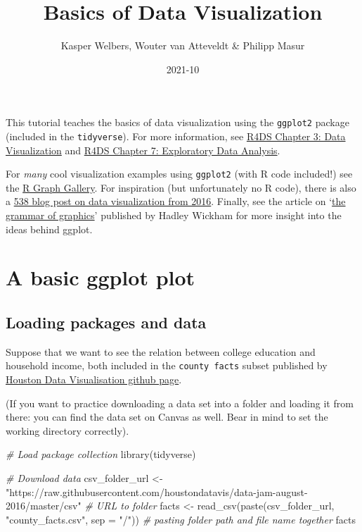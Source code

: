 \documentclass[
]{article}
\title{Basics of Data Visualization}
\author{Kasper Welbers, Wouter van Atteveldt \& Philipp Masur}
\date{2021-10}
\newenvironment{Shaded}{\begin{snugshade}}{\end{snugshade}}
\newcommand{\AttributeTok}[1]{\textcolor[rgb]{0.77,0.63,0.00}{#1}}
\newcommand{\CommentTok}[1]{\textcolor[rgb]{0.56,0.35,0.01}{\textit{#1}}}
\newcommand{\FunctionTok}[1]{\textcolor[rgb]{0.00,0.00,0.00}{#1}}
\newcommand{\NormalTok}[1]{#1}
\newcommand{\OtherTok}[1]{\textcolor[rgb]{0.56,0.35,0.01}{#1}}
\newcommand{\StringTok}[1]{\textcolor[rgb]{0.31,0.60,0.02}{#1}}
\begin{document}
\maketitle

{
\setcounter{tocdepth}{2}
\tableofcontents
}
This tutorial teaches the basics of data visualization using the
\texttt{ggplot2} package (included in the \texttt{tidyverse}). For more
information, see
\href{http://r4ds.had.co.nz/data-visualisation.html}{R4DS Chapter 3:
Data Visualization} and
\href{http://r4ds.had.co.nz/exploratory-data-analysis.html}{R4DS Chapter
7: Exploratory Data Analysis}.

For \emph{many} cool visualization examples using \texttt{ggplot2} (with
R code included!) see the
\href{https://www.r-graph-gallery.com/portfolio/ggplot2-package/}{R
Graph Gallery}. For inspiration (but unfortunately no R code), there is
also a
\href{https://fivethirtyeight.com/features/the-52-best-and-weirdest-charts-we-made-in-2016/}{538
blog post on data visualization from 2016}. Finally, see the article on
`\href{http://vita.had.co.nz/papers/layered-grammar.html}{the grammar of
graphics}' published by Hadley Wickham for more insight into the ideas
behind ggplot.

\hypertarget{a-basic-ggplot-plot}{%
\section{A basic ggplot plot}\label{a-basic-ggplot-plot}}

\hypertarget{loading-packages-and-data}{%
\subsection{Loading packages and data}\label{loading-packages-and-data}}

Suppose that we want to see the relation between college education and
household income, both included in the \texttt{county\ facts} subset
published by
\href{https://github.com/houstondatavis/data-jam-august-2016}{Houston
Data Visualisation github page}.

(If you want to practice downloading a data set into a folder and
loading it from there: you can find the data set on Canvas as well. Bear
in mind to set the working directory correctly).

\begin{Shaded}
\begin{Highlighting}[]
\CommentTok{\# Load package collection}
\FunctionTok{library}\NormalTok{(tidyverse)}

\CommentTok{\# Download data}
\NormalTok{csv\_folder\_url }\OtherTok{\textless{}{-}} \StringTok{"https://raw.githubusercontent.com/houstondatavis/data{-}jam{-}august{-}2016/master/csv"}  \CommentTok{\# URL to folder }
\NormalTok{facts }\OtherTok{\textless{}{-}} \FunctionTok{read\_csv}\NormalTok{(}\FunctionTok{paste}\NormalTok{(csv\_folder\_url, }\StringTok{"county\_facts.csv"}\NormalTok{, }\AttributeTok{sep =} \StringTok{"/"}\NormalTok{)) }\CommentTok{\# pasting folder path and file name together}
\NormalTok{facts}
\end{Highlighting}
\end{Shaded}
\end{document}
